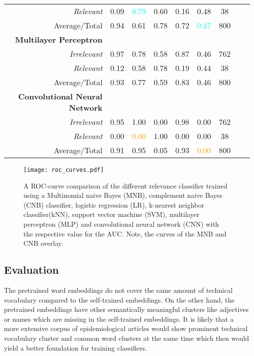 \begin{table}[h!]
\begin{tabular}{@{}rcccccccc@{}}
      \textsl{Relevant}& 0.09& \textcolor{cyan}{0.79}&  0.60& 0.16& 0.48& 38 \\
      Average/Total& 0.94& 0.61& 0.78& 0.72& \textcolor{cyan}{0.47}& 800 \vspace{2mm}\\
      \textbf{Multilayer Perceptron}\\
      \textsl{Irrelevant}& 0.97& 0.78&  0.58& 0.87& 0.46& 762 \\
      \textsl{Relevant}& 0.12& 0.58&  0.78& 0.19& 0.44& 38 \\
      Average/Total& 0.93& 0.77& 0.59& 0.83& 0.46& 800 \\
      \textbf{Convolutional Neural Network}\\
      \textsl{Irrelevant}& 0.95& 1.00&  0.00& 0.98& 0.00& 762 \\
      \textsl{Relevant}& 0.00& \textcolor{orange}{0.00}&  1.00& 0.00& 0.00& 38 \\
      Average/Total& 0.91& 0.95& 0.05& 0.93& \textcolor{orange}{0.00}& 800 \\
      \bottomrule
    \end{tabular}
  \label{table:recommender_performance}
  \end{table}

  \begin{figure}[h!]
    \centering
    \texttt{[image: roc\_curves.pdf]}
    \caption{A ROC-curve comparison of the different relevance classifier trained using a Multinomial naive Bayes (MNB), complement naive Bayes (CNB) classifier, logistic regression (LR), k-nearest neighbor classifier(kNN), support vector machine (SVM), multilayer perceptron (MLP) and convolutional neural network (CNN) with the respective value for the AUC. Note, the curves of the MNB and CNB overlay.}
  \label{fig:roc}
  \end{figure}

\subsection{Evaluation}\label{eval_recommend}
  The pretrained word embeddings do not cover the same amount of technical vocabulary compared to the self-trained embeddings. On the other hand, the pretrained embeddings have other semantically meaningful clusters like adjectives or names which are missing in the self-trained embeddings.
  It is likely that a more extensive corpus of epidemiological articles would show prominent technical vocabulary cluster and common word clusters at the same time which then would yield a better foundation for training classifiers.

